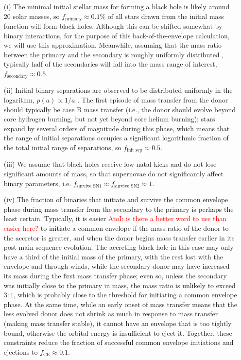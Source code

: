 \documentclass[iop,onecolumn]{revtex4}
\newcommand{\ajf}[1]{\textcolor{red}{AtoI: #1}}
\begin{document}
\begin{enumerate}
	\item[(i)] The minimal initial stellar mass for forming a black hole is likely around 20 solar masses, so $f_\textrm{primary} \approx 0.1\%$ of all stars drawn from the \citet{Kroupa:2002} initial mass function will form black holes. Although this can be shifted somewhat by binary interactions, for the purpose of this back-of-the-envelope calculation, we will use this approximation. Meanwhile, assuming that the mass ratio between the primary and the secondary is roughly uniformly distributed \citep{Sana:2012}, typically half of the secondaries will fall into the mass range of interest, $f_\textrm{secondary} \approx 0.5$.  

\item[(ii)] Initial binary  separations are observed to be distributed uniformly in the logarithm, $p(a) \propto 1/a$ \citep{Opik:1924}.  The first episode of mass transfer from the donor should typically be case B mass transfer (i.e., the donor should evolve beyond core hydrogen burning, but not yet beyond core helium burning); stars expand by several orders of magnitude during this phase, which means that the range of initial separations occupies a significant logarithmic fraction of the total initial range of separations, so $f_\textrm{init sep} \approx 0.5$.  

\item[(iii)]  We assume that black holes receive low natal kicks and do not lose significant amounts of mass, so that supernovae do not significantly affect binary parameters, i.e. $f_\textrm{survive SN1} \approx f_\textrm{survive SN2} \approx 1$.  

\item[(iv)] The fraction of binaries that initiate and survive the common envelope phase during mass transfer from the secondary to the primary is perhaps the least certain.  Typically, it is easier \ajf{is there a better word to use than easier here?} to initiate a common envelope if the mass ratio of the donor to the accretor is greater, and when the donor begins mass transfer earlier in its post-main-sequence evolution.  The accreting black hole in this case may only have a third of the initial mass of the primary, with the rest lost with the envelope and through winds, while the secondary donor may have increased its mass during the first mass transfer phase; even so, unless the secondary was initially close to the primary in mass, the mass ratio is unlikely to exceed $3:1$, which is probably close to the threshold for initiating a common envelope phase.  At the same time, while an early onset of mass transfer means that the less evolved donor does not shrink as much in response to mass transfer (making mass transfer stable), it cannot have an envelope that is too tightly bound, otherwise the orbital energy is insufficient to eject it.  Together, these constraints reduce the fraction of successful common envelope initiations and ejections to $f_\textrm{CE} \approx 0.1$.  


\end{enumerate}
\end{document}
